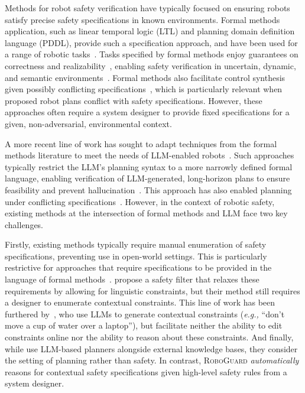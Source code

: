 Methods for robot safety verification have typically focused on ensuring robots satisfy precise safety specifications in known environments.  
Formal methods application, such as linear temporal logic (LTL) and planning domain definition language (PDDL), provide such a specification approach, and have been used for a range of robotic tasks~\cite{pnueli1977temporal, fox2003pddl2}. 
Tasks specified by formal methods enjoy guarantees on correctness and realizability~\cite{kress2018synthesis, wongpiromsarn2011tulip, vasile2013sampling}, enabling safety verification in uncertain, dynamic, and semantic environments~\cite{vasile2013sampling, shah2020planning, purohit2021dynamic_ltl, menghi2018multiuncertainty, fu2016optimalsemanticltl, kantaros2022perception}.
Formal methods also facilitate control synthesis given possibly conflicting specifications~\cite{tuumova2013minimumviolationltl}, which is particularly relevant when proposed robot plans conflict with safety specifications. 
However, these approaches often require a system designer to provide fixed specifications for a given, non-adversarial, environmental context.

A more recent line of work has sought to adapt techniques from the formal methods literature to meet the needs of LLM-enabled robots~\cite{liu2023grounding, quartey2024verifiably, chen2024autotamp, liu2023llmp}.  Such approaches typically restrict the LLM's planning syntax to a more narrowly defined formal language, enabling verification of LLM-generated, long-horizon plans to ensure feasibility and prevent hallucination~\cite{mavrogiannis2024cook2ltl, quartey2024verifiably}.  This approach has also enabled planning under conflicting specifications~\cite{optimalscenegraphllm}.  However, in the context of robotic safety, existing methods at the intersection of formal methods and LLM face two key challenges.

Firstly, existing methods typically require manual enumeration of safety specifications, preventing use in open-world settings.  This is particularly restrictive for approaches that require specifications to be provided in the language of formal methods~\cite{yang2024joint}.  \citet{yang2023plugsafetychipenforcing} propose a safety filter that relaxes these requirements by allowing for linguistic constraints, but their method still requires a designer to enumerate contextual constraints. 
This line of work has been furthered by~\citet{brunke2024semantically}, who use LLMs to generate contextual constraints (\textit{e.g.,} ``don't move a cup of water over a laptop''), but facilitate neither the ability to edit constraints online nor the ability to reason about these constraints. And finally, while \citet{fadhil2024saycomplyllm} use LLM-based planners alongside external knowledge bases, they consider the setting of planning rather than safety. In contrast, \textsc{RoboGuard} \emph{automatically} reasons for contextual safety specifications given high-level safety rules from a system designer.

